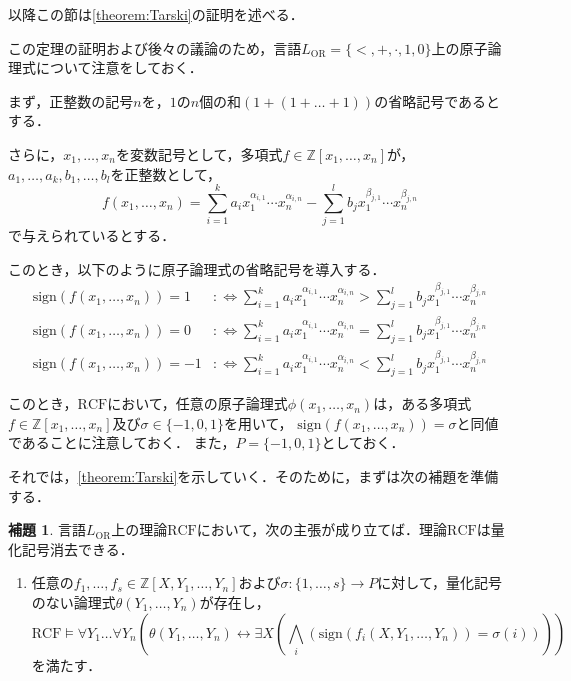 \documentclass[uplatex, dvipdfmx]{jsarticle}
\numberwithin{equation}{section}
\newcommand{\Z}{\mathbb{Z}}
\newcommand{\defiff}{ :\Leftrightarrow}
\newcommand{\RCF}{\mathrm{RCF}}
\newcommand{\sign}{\mathrm{sign}}
\newcommand{\map}[3]{{#1}\colon{#2}\rightarrow{#3}}
\theoremstyle{definition}
\newtheorem{lemma}[definition]{補題}
\begin{document}
以降この節は\cref{theorem:Tarski}の証明を述べる．

この定理の証明および後々の議論のため，言語$L_\mathrm{OR} = \{<, +, \cdot, 1, 0\}$上の原子論理式について注意をしておく．

まず，正整数の記号$n$を，$1$の$n$個の和$(1 + (1 + \dots + 1 ))$の省略記号であるとする．

さらに，$x_1, \dots, x_n$を変数記号として，多項式$f \in \Z[x_1, \dots, x_n]$が，$a_1, \dots, a_k, b_1, \dots, b_l$を正整数として，
\begin{equation}
     f(x_1, \dots, x_n) = \sum_{i=1}^k a_i x_1^{\alpha_{i,1}} \cdots x_n^{\alpha_{i,n}} - \sum_{j=1}^l b_j x_1^{\beta_{j,1}} \cdots x_n^{\beta_{j,n}}
\end{equation}
で与えられているとする．

このとき，以下のように原子論理式の省略記号を導入する．
\begin{align}
     \sign (f(x_1, \dots, x_n)) = 1 &\defiff \sum_{i=1}^k a_i x_1^{\alpha_{i,1}} \cdots x_n^{\alpha_{i,n}} > \sum_{j=1}^l b_j x_1^{\beta_{j,1}} \cdots x_n^{\beta_{j,n}}\\
     \sign (f(x_1, \dots, x_n)) = 0 &\defiff \sum_{i=1}^k a_i x_1^{\alpha_{i,1}} \cdots x_n^{\alpha_{i,n}} = \sum_{j=1}^l b_j x_1^{\beta_{j,1}} \cdots x_n^{\beta_{j,n}}\\
     \sign (f(x_1, \dots, x_n)) = -1 &\defiff \sum_{i=1}^k a_i x_1^{\alpha_{i,1}} \cdots x_n^{\alpha_{i,n}} < \sum_{j=1}^l b_j x_1^{\beta_{j,1}} \cdots x_n^{\beta_{j,n}}
\end{align}

このとき，$\RCF$において，任意の原子論理式$\phi(x_1, \dots, x_n)$は，ある多項式$f \in \Z[x_1, \dots, x_n]$及び$\sigma \in \{-1, 0, 1\}$を用いて，
$\sign(f(x_1, \dots, x_n)) = \sigma$と同値であることに注意しておく．
また，$P = \{-1, 0, 1\}$としておく．

それでは，\cref{theorem:Tarski}を示していく．そのために，まずは次の補題を準備する．


\begin{lemma}\label{lemma:qe_simplify}
     言語$L_\mathrm{OR}$上の理論$\RCF$において，次の主張が成り立てば．理論$\RCF$は量化記号消去できる．

     \begin{enumerate}
          \item \label{qe_1}
          任意の$f_1, \dots, f_s \in \Z[X, Y_1, \dots, Y_n]$および$\map{\sigma}{\{1,\dots, s\}}{P}$に対して，量化記号のない論理式$\theta(Y_1, \dots, Y_n)$が存在し，
          \begin{equation}
               \RCF \models \forall Y_1 \dots \forall Y_n ( \theta(Y_1, \dots, Y_n) \leftrightarrow \exists X(\bigwedge_i (\sign(f_i(X,Y_1, \dots, Y_n))= \sigma(i))) )
          \end{equation}
          を満たす．
     \end{enumerate}
\end{lemma}
\end{document}
